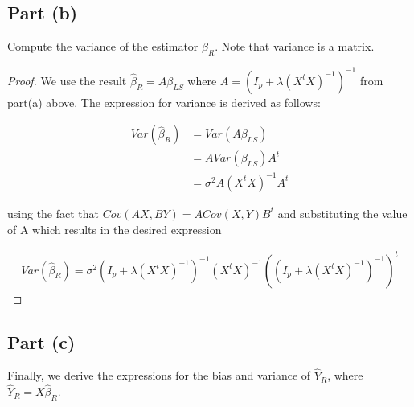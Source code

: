 \documentclass[paper=a4, fontsize=11pt]{scrartcl} %
\numberwithin{equation}{section} %
\begin{document}
\subsection*{Part (b)}

Compute the variance of the estimator $\hat{\beta}_R$. Note that variance is a matrix.

\begin{proof}

We use the result $\hat{\beta}_R = A \beta_{LS}$ where $A = (I_p + \lambda(X^t X)^{-1})^{-1}$ from part(a) above. The expression for variance is derived as follows:

\begin{align}
Var(\hat{\beta}_R) &= Var(A \beta_{LS}) \\
&= A Var(\beta_{LS}) A^t \\
&= \sigma^2 A (X^t X)^{-1} A^t
\end{align}

using the fact that $Cov(AX, BY) = A Cov(X, Y) B^t$ and substituting the value of A which results in the desired expression 

\begin{align}
Var(\hat{\beta}_R) = \sigma^2 (I_p + \lambda(X^t X)^{-1})^{-1} (X^t X)^{-1} ((I_p + \lambda(X^t X)^{-1})^{-1})^t
\end{align}

\end{proof}

\subsection*{Part (c)}

Finally, we derive the expressions for the bias and variance of $\hat{Y}_R$, where $\hat{Y}_R = X \hat{\beta}_R$.
\end{document}
